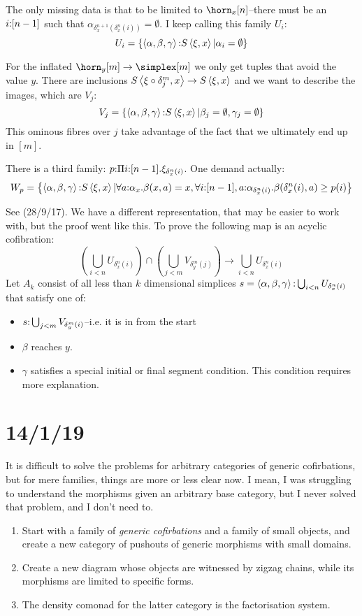 \documentclass[csh.tex]{subfiles}
\begin{document}
The only missing data is that to be limited to $\horn_x[n]$--there must be an 
$i\mathord :[n-1]$ such that $\alpha_{\delta^{n+1}_x(\delta^n_x(i))}=\emptyset$. I keep
 calling this family $U_i$:
\[U_i = \left\{\left\langle \alpha,\beta,\gamma \right\rangle\mathord : S\left\langle \xi,x \right\rangle|\alpha_i = \emptyset\right\}\]

For the inflated $\horn_y[m]\to\simplex[m]$ we only get tuples that avoid the 
value $y$. There are inclusions 
$S\left\langle \xi\circ \delta^m_j,x \right\rangle\to S\left\langle \xi,x \right\rangle$ and we want to describe the
 images, which are $V_j$:
\[V_j = \left\{\left\langle \alpha,\beta,\gamma \right\rangle\mathord : S\left\langle \xi,x \right\rangle|\beta_j=\emptyset,\gamma_j=\emptyset \right\}\]
This ominous fibres over $j$ take advantage of the fact that we ultimately end 
up in $[m]$.

There is a third family: $p\mathord :\Pi i\mathord :[n-1] .\xi_{\delta^n_x(i)}$. One 
demand actually:
\[W_p = \left\{\left\langle \alpha,\beta,\gamma \right\rangle\mathord : S\left\langle \xi,x \right\rangle|
	\forall a\mathord :\alpha_x.\beta(x,a)=x,\forall i\mathord :[n-1], a\mathord :\alpha_{\delta^n_x(i)}.\beta(\delta^n_x(i),a)\geq p(i)
\right\}\]

See (28/9/17). We have a different representation, that may be easier to work 
with, but the proof went like this. To prove the following map is an acyclic 
cofibration:
\[(\bigcup_{i<n} U_{\delta^n_x(i)}) \cap (\bigcup_{j<m} V_{\delta^m_y(j)}) \to \bigcup_{i<n} U_{\delta^n_x(i)}\]
Let $A_k$ consist of all less than $k$ dimensional simplices 
$s=\left\langle \alpha,\beta,\gamma \right\rangle\mathord :\bigcup_{i<n} U_{\delta^n_x(i)}$ that satisfy 
one of:
\begin{itemize}
\item $s\mathord : \bigcup_{j<m} V_{\delta^m_y(i)}$--i.e. it is in from the start
\item $\beta$ reaches $y$.
\item $\gamma$ satisfies a special initial or final segment condition.
This condition requires more explanation.
\end{itemize}

\section{14/1/19}
It is difficult to solve the problems for arbitrary categories of generic cofirbations, but for mere families, things are more or less clear now. I mean, I was struggling to understand the morphisms given an arbitrary base category, but I never solved that problem, and I don't need to.

\begin{enumerate}
	\item Start with a family of \emph{generic cofirbations} and a family of small objects, and create a new category of pushouts of generic morphisms with small domains.
	\item Create a new diagram whose objects are witnessed by zigzag chains, while its morphisms are limited to specific forms.
	\item The density comonad for the latter category is the factorisation system.
\end{enumerate}
\end{document}
